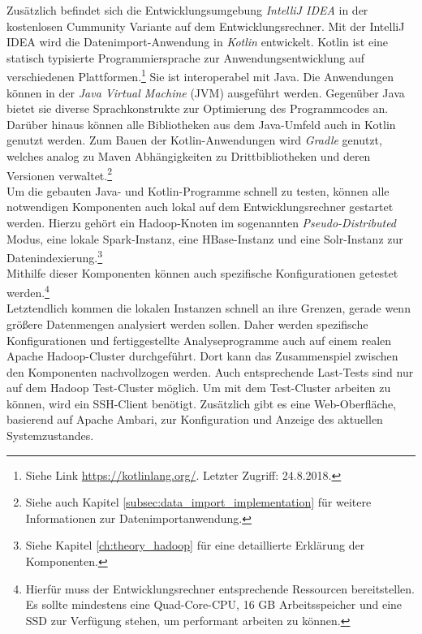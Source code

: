 \noindent
Zusätzlich befindet sich die Entwicklungsumgebung \textit{IntelliJ IDEA} in der kostenlosen Cummunity Variante  auf dem Entwicklungsrechner. Mit der IntelliJ IDEA wird die Datenimport-Anwendung in \textit{Kotlin} entwickelt. Kotlin ist eine statisch typisierte Programmiersprache zur Anwendungsentwicklung auf verschiedenen Plattformen.\footnote{Siehe Link \url{https://kotlinlang.org/}. Letzter Zugriff: 24.8.2018.} Sie ist interoperabel mit Java. Die Anwendungen können in der \textit{Java Virtual Machine} (JVM) ausgeführt werden. Gegenüber Java bietet sie diverse Sprachkonstrukte zur Optimierung des Programmcodes an. Darüber hinaus können alle Bibliotheken aus dem Java-Umfeld auch in Kotlin genutzt werden. Zum Bauen der Kotlin-Anwendungen wird \textit{Gradle} genutzt, welches analog zu Maven Abhängigkeiten zu Drittbibliotheken und deren Versionen verwaltet.\footnote{Siehe auch Kapitel \ref{subsec:data_import_implementation} für weitere Informationen zur Datenimportanwendung.}\\


\noindent
Um die gebauten Java- und Kotlin-Programme schnell zu testen, können alle notwendigen Komponenten auch lokal auf dem Entwicklungsrechner gestartet werden. Hierzu gehört ein Hadoop-Knoten im sogenannten \textit{Pseudo-Distributed} Modus, eine lokale Spark-Instanz, eine HBase-Instanz und eine Solr-Instanz zur Datenindexierung.\footnote{Siehe Kapitel \ref{ch:theory_hadoop} für eine detaillierte Erklärung der Komponenten.}\\
Mithilfe dieser Komponenten können auch spezifische Konfigurationen getestet werden.\footnote{Hierfür muss der Entwicklungsrechner entsprechende Ressourcen bereitstellen. Es sollte mindestens eine Quad-Core-CPU, 16 GB Arbeitsspeicher und eine SSD zur Verfügung stehen, um performant arbeiten zu können.} \\
Letztendlich kommen die lokalen Instanzen schnell an ihre Grenzen, gerade wenn größere Datenmengen analysiert werden sollen. Daher werden spezifische Konfigurationen und fertiggestellte Analyseprogramme auch auf einem realen
Apache Hadoop-Cluster durchgeführt. Dort kann das Zusammenspiel zwischen den Komponenten nachvollzogen werden. Auch entsprechende Last-Tests sind nur auf dem Hadoop Test-Cluster möglich. Um mit dem Test-Cluster arbeiten zu können, wird ein SSH-Client benötigt. Zusätzlich gibt es eine Web-Oberfläche, basierend auf Apache Ambari, zur Konfiguration und Anzeige des aktuellen Systemzustandes.\\

